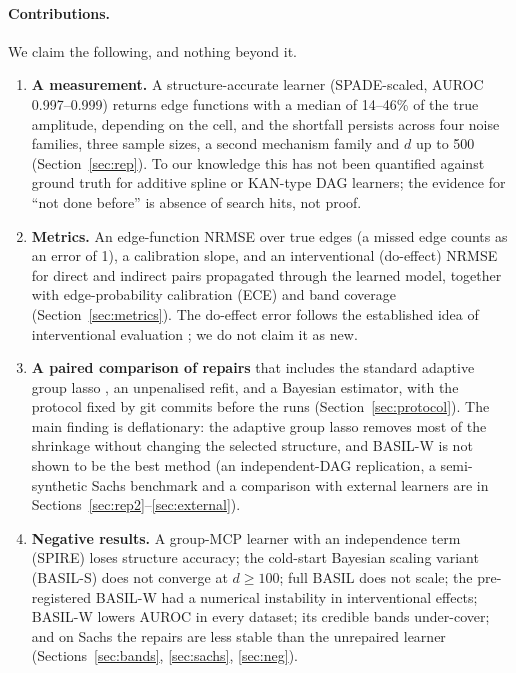 \documentclass[11pt,a4paper]{article}
\begin{document}
\paragraph{Contributions.} We claim the following, and nothing beyond it.
\begin{enumerate}[leftmargin=*,itemsep=2pt]
  \item \textbf{A measurement.} A structure-accurate learner (SPADE-scaled, AUROC 0.997--0.999) returns edge functions with a median of 14--46\% of the true amplitude, depending on the cell, and the shortfall persists across four noise families, three sample sizes, a second mechanism family and $d$ up to 500 (Section~\ref{sec:rep}). To our knowledge this has not been quantified against ground truth for additive spline or KAN-type DAG learners; the evidence for ``not done before'' is absence of search hits, not proof.
  \item \textbf{Metrics.} An edge-function NRMSE over true edges (a missed edge counts as an error of 1), a calibration slope, and an interventional (do-effect) NRMSE for direct and indirect pairs propagated through the learned model, together with edge-probability calibration (ECE) and band coverage (Section~\ref{sec:metrics}). The do-effect error follows the established idea of interventional evaluation \citep{gentzel2019}; we do not claim it as new.
  \item \textbf{A paired comparison of repairs} that includes the standard adaptive group lasso \citep{huang2010}, an unpenalised refit, and a Bayesian estimator, with the protocol fixed by git commits before the runs (Section~\ref{sec:protocol}). The main finding is deflationary: the adaptive group lasso removes most of the shrinkage without changing the selected structure, and BASIL-W is not shown to be the best method (an independent-DAG replication, a semi-synthetic Sachs benchmark and a comparison with external learners are in Sections~\ref{sec:rep2}--\ref{sec:external}).
  \item \textbf{Negative results.} A group-MCP learner with an independence term (SPIRE) loses structure accuracy; the cold-start Bayesian scaling variant (BASIL-S) does not converge at $d\ge100$; full BASIL does not scale; the pre-registered BASIL-W had a numerical instability in interventional effects; BASIL-W lowers AUROC in every dataset; its credible bands under-cover; and on Sachs the repairs are less stable than the unrepaired learner (Sections~\ref{sec:bands}, \ref{sec:sachs}, \ref{sec:neg}).
\end{enumerate}
\end{document}
